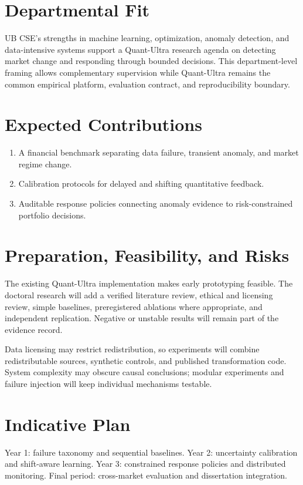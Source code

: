 \documentclass[11pt]{article}
\begin{document}
\newpage
\section*{Departmental Fit}
UB CSE's strengths in machine learning, optimization, anomaly detection, and data-intensive systems support a Quant-Ultra research agenda on detecting market change and responding through bounded decisions. This department-level framing allows complementary supervision while Quant-Ultra remains the common empirical platform, evaluation contract, and reproducibility boundary.

\section*{Expected Contributions}
\begin{enumerate}
\item A financial benchmark separating data failure, transient anomaly, and market regime change.
\item Calibration protocols for delayed and shifting quantitative feedback.
\item Auditable response policies connecting anomaly evidence to risk-constrained portfolio decisions.
\end{enumerate}

\section*{Preparation, Feasibility, and Risks}
The existing Quant-Ultra implementation makes early prototyping feasible. The doctoral research will add a verified literature review, ethical and licensing review, simple baselines, preregistered ablations where appropriate, and independent replication. Negative or unstable results will remain part of the evidence record.

Data licensing may restrict redistribution, so experiments will combine redistributable sources, synthetic controls, and published transformation code. System complexity may obscure causal conclusions; modular experiments and failure injection will keep individual mechanisms testable.

\section*{Indicative Plan}
Year 1: failure taxonomy and sequential baselines. Year 2: uncertainty calibration and shift-aware learning. Year 3: constrained response policies and distributed monitoring. Final period: cross-market evaluation and dissertation integration.
\end{document}
